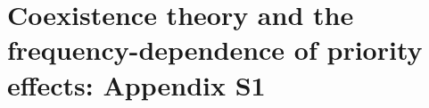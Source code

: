 \chapter{Coexistence theory and the frequency-dependence of priority effects: Appendix S1}
\fancyhead[LE, RO]{\thepage}
\fancyfoot{}
\renewcommand{\headrulewidth}{0pt}
\setlength{\parindent}{1cm}


\begin{comment}
\documentclass[hidelinks,12pt]{article}
\usepackage{graphicx,bm, booktabs,lineno,array}
\usepackage[fleqn]{amsmath}
\setlength{\mathindent}{0pt}
\usepackage[super,comma,numbers, compress]{natbib}
\usepackage[a4paper]{geometry}
\usepackage[parfill]{parskip}
\usepackage[usenames,dvipsnames]{color}
\usepackage[font=footnotesize,labelfont=bf,margin=1cm, labelsep = none]{caption} 
\usepackage{setspace}
\usepackage{gensymb}
\usepackage{color} 
\usepackage{sidecap}
\usepackage{epigraph}
\usepackage{float}
\usepackage{soul,xcolor}
\setstcolor{red}
\setlength\epigraphwidth{12cm}
\setlength\epigraphrule{0pt}
\usepackage{etoolbox}
\usepackage{tcolorbox}
\tcbuselibrary{breakable}
\usepackage[bottom, symbol]{footmisc}
\usepackage{authblk}
\usepackage{hyperref}
\usepackage[color=cyan]{todonotes}
\pdfminorversion=3
\doublespacing

\renewcommand{\epigraphflush}{center}
\renewcommand{\sourceflush}{flushleft}
\newcommand{\plus}{\raisebox{.4\height}{\scalebox{.6}{+}}}
\newcommand{\minus}{\raisebox{.4\height}{\scalebox{.8}{-}}}
\renewcommand{\thefootnote}{\fnsymbol{footnote}}
\newcommand*\samethanks[1][\value{footnote}]{\footnotemark[#1]}
\newcommand\blfootnote[1]{%
\begingroup
\renewcommand\thefootnote{}\footnote{#1}%
\addtocounter{footnote}{-1}%
\endgroup
}
\end{comment}



